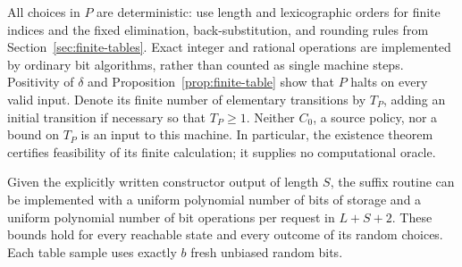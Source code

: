 All choices in $P$ are deterministic: use length and lexicographic orders
for finite indices and the fixed elimination, back-substitution, and
rounding rules from Section~\ref{sec:finite-tables}.  Exact integer and
rational operations are implemented by ordinary bit algorithms, rather
than counted as single machine steps.  Positivity of $\delta$ and
Proposition~\ref{prop:finite-table} show that $P$ halts on every valid
input.  Denote its finite number of elementary transitions by $T_P$, adding
an initial transition if necessary so that $T_P\ge1$.  Neither $C_0$, a
source policy, nor a bound on $T_P$ is an input to this machine.  In
particular, the existence theorem certifies feasibility of its finite
calculation; it supplies no computational oracle.

\begin{lemma}
\label{lem:bounded-implementation}
Given the explicitly written constructor output of length $S$, the suffix
routine can be implemented with a uniform polynomial number of bits of
storage and a uniform polynomial number of bit operations per request in
$L+S+2$.  These bounds hold for every reachable state and every outcome of
its random choices.  Each table sample uses exactly $b$ fresh unbiased
random bits.
\end{lemma}


